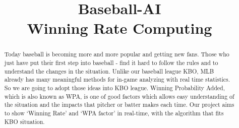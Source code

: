 \documentclass[conference,compsoc, twocolumn]{IEEEtran}
\begin{document}
\title{Baseball-AI\\ Winning Rate Computing}

\author{
}

\maketitle

\begin{abstract}
\quad Today baseball is becoming more and more popular and getting new fans. Those who just have put their first step into baseball - find it hard to follow the rules and to understand the changes in the situation. Unlike our baseball league KBO, MLB already has many meaningful methods for in-game analyzing with real time statistics. So we are going to adopt those ideas into KBO league. Winning Probability Added, which is also known as WPA, is one of good factors which allows easy understanding of the situation and the impacts that pitcher or batter makes each time. Our project aims to show ‘Winning Rate’ and ‘WPA factor’ in real-time, with the algorithm that fits KBO situation.
\end{abstract}
\end{document}
